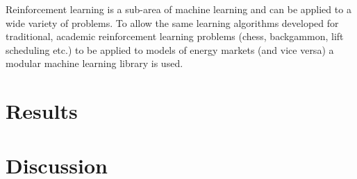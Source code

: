 Reinforcement learning is a sub-area of machine learning and can be applied to
a wide variety of problems.  To allow the same
learning algorithms developed for traditional, academic reinforcement learning
problems (chess, backgammon, lift scheduling etc.) to be applied to models of
energy markets (and vice versa) a modular machine learning library is used.

\chapter{Results}
\label{ch:results}

\chapter{Discussion}
\label{ch:discuss}
